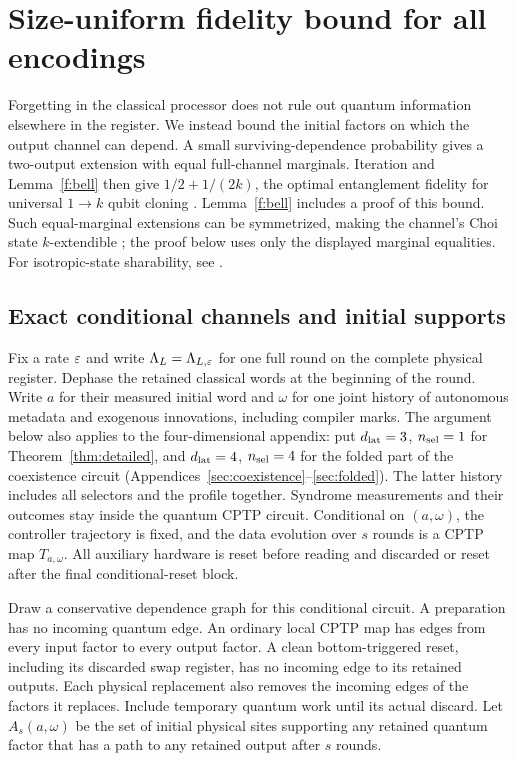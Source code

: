 \section{Size-uniform fidelity bound for all encodings}\label{sec:forgetting}

Forgetting in the classical processor does not rule out quantum information elsewhere in the register. We instead bound the initial factors on which the output channel can depend. A small surviving-dependence probability gives a two-output extension with equal full-channel marginals. Iteration and Lemma~\ref{f:bell} then give \(1/2+1/(2k)\), the optimal entanglement fidelity for universal \(1\to k\) qubit cloning \cite{KeylWerner1999,Werner1998}. Lemma~\ref{f:bell} includes a proof of this bound. Such equal-marginal extensions can be symmetrized, making the channel's Choi state \(k\)-extendible \cite{Kaur2019,Kaur2021}; the proof below uses only the displayed marginal equalities. For isotropic-state sharability, see \cite{JohnsonViola2013}.

\subsection{Exact conditional channels and initial supports}

Fix a rate \(\varepsilon\) and write \(\Lambda_L=\Lambda_{L,\varepsilon}\) for one full round on the complete physical register. Dephase the retained classical words at the beginning of
the round. Write \(a\) for their measured initial word and \(\omega\)
for one joint history of autonomous metadata and exogenous
innovations, including compiler marks. The argument below also applies
to the four-dimensional appendix: put \(d_{\rm lat}=3\), \(n_{\rm sel}=1\)
for Theorem~\ref{thm:detailed}, and \(d_{\rm lat}=4\), \(n_{\rm sel}=4\)
for the folded part of the coexistence circuit (Appendices~\ref{sec:coexistence}--\ref{sec:folded}). The latter history includes all selectors and the
profile together. Syndrome measurements and their outcomes stay
inside the quantum CPTP circuit. Conditional on \((a,\omega)\),
the controller trajectory is fixed, and the data evolution over \(s\)
rounds is a CPTP map \(T_{a,\omega}\). All auxiliary hardware is reset before
reading and discarded or reset after the final conditional-reset block.

Draw a conservative dependence graph for this conditional circuit.
A preparation has no incoming quantum edge. An ordinary local CPTP
map has edges from every input factor to every output factor. A clean
bottom-triggered reset, including its discarded swap register,
has no incoming edge to its retained outputs. Each physical replacement
also removes the incoming edges of the factors it replaces. Include temporary quantum work
until its actual discard. Let \(A_s(a,\omega)\) be the set of initial
physical sites supporting any retained quantum factor that has a path to any retained output after \(s\)
rounds.

